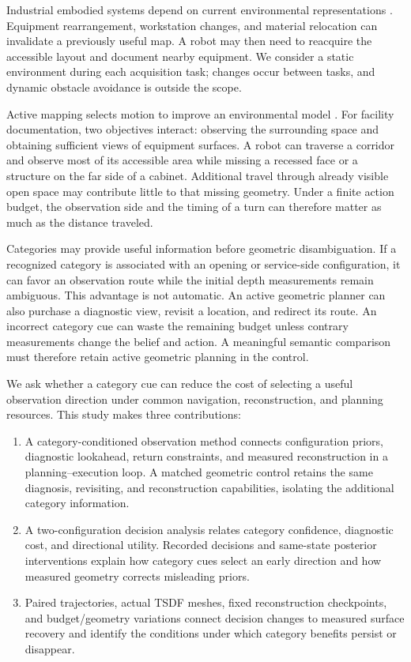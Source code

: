 \documentclass[pdflatex,sn-mathphys-num]{sn-jnl}
\providecommand{\tightlist}{\setlength{\itemsep}{0pt}\setlength{\parskip}{0pt}}
\begin{document}
Industrial embodied systems depend on current environmental representations \cite{ref9}. Equipment rearrangement, workstation changes, and material relocation can invalidate a previously useful map. A robot may then need to reacquire the accessible layout and document nearby equipment. We consider a static environment during each acquisition task; changes occur between tasks, and dynamic obstacle avoidance is outside the scope.

Active mapping selects motion to improve an environmental model \cite{ref10}. For facility documentation, two objectives interact: observing the surrounding space and obtaining sufficient views of equipment surfaces. A robot can traverse a corridor and observe most of its accessible area while missing a recessed face or a structure on the far side of a cabinet. Additional travel through already visible open space may contribute little to that missing geometry. Under a finite action budget, the observation side and the timing of a turn can therefore matter as much as the distance traveled.

Categories may provide useful information before geometric disambiguation. If a recognized category is associated with an opening or service-side configuration, it can favor an observation route while the initial depth measurements remain ambiguous. This advantage is not automatic. An active geometric planner can also purchase a diagnostic view, revisit a location, and redirect its route. An incorrect category cue can waste the remaining budget unless contrary measurements change the belief and action. A meaningful semantic comparison must therefore retain active geometric planning in the control.

We ask whether a category cue can reduce the cost of selecting a useful observation direction under common navigation, reconstruction, and planning resources. This study makes three contributions:

\begin{enumerate}
\def\labelenumi{\arabic{enumi}.}
\tightlist
\item
  A category-conditioned observation method connects configuration priors, diagnostic lookahead, return constraints, and measured reconstruction in a planning--execution loop. A matched geometric control retains the same diagnosis, revisiting, and reconstruction capabilities, isolating the additional category information.
\item
  A two-configuration decision analysis relates category confidence, diagnostic cost, and directional utility. Recorded decisions and same-state posterior interventions explain how category cues select an early direction and how measured geometry corrects misleading priors.
\item
  Paired trajectories, actual TSDF meshes, fixed reconstruction checkpoints, and budget/geometry variations connect decision changes to measured surface recovery and identify the conditions under which category benefits persist or disappear.
\end{enumerate}
\end{document}
